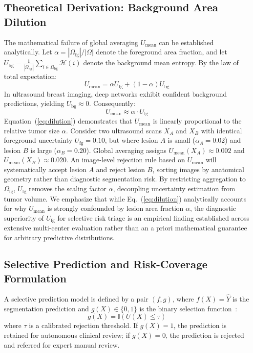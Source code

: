 \documentclass[10pt,journal,compsoc]{IEEEtran}
\begin{document}
\subsection{Theoretical Derivation: Background Area Dilution}
The mathematical failure of global averaging $U_{\mathrm{mean}}$ can be established analytically. Let $\alpha = |\Omega_{\mathrm{fg}}| / |\Omega|$ denote the foreground area fraction, and let $U_{\mathrm{bg}} = \frac{1}{|\Omega_{\mathrm{bg}}|} \sum_{i \in \Omega_{\mathrm{bg}}} \mathcal{H}(i)$ denote the background mean entropy. By the law of total expectation:
\begin{equation}
U_{\mathrm{mean}} = \alpha U_{\mathrm{fg}} + (1 - \alpha) U_{\mathrm{bg}}
\end{equation}
In ultrasound breast imaging, deep networks exhibit confident background predictions, yielding $U_{\mathrm{bg}} \approx 0$. Consequently:
\begin{equation}
U_{\mathrm{mean}} \approx \alpha \cdot U_{\mathrm{fg}}
\label{eq:dilution}
\end{equation}
Equation~(\ref{eq:dilution}) demonstrates that $U_{\mathrm{mean}}$ is linearly proportional to the relative tumor size $\alpha$. Consider two ultrasound scans $X_A$ and $X_B$ with identical foreground uncertainty $U_{\mathrm{fg}} = 0.10$, but where lesion $A$ is small ($\alpha_A = 0.02$) and lesion $B$ is large ($\alpha_B = 0.20$). Global averaging assigns $U_{\mathrm{mean}}(X_A) \approx 0.002$ and $U_{\mathrm{mean}}(X_B) \approx 0.020$. An image-level rejection rule based on $U_{\mathrm{mean}}$ will systematically accept lesion $A$ and reject lesion $B$, sorting images by anatomical geometry rather than diagnostic segmentation risk. By restricting aggregation to $\Omega_{\mathrm{fg}}$, $U_{\mathrm{fg}}$ removes the scaling factor $\alpha$, decoupling uncertainty estimation from tumor volume. We emphasize that while Eq.~(\ref{eq:dilution}) analytically accounts for why $U_{\mathrm{mean}}$ is strongly confounded by lesion area fraction $\alpha$, the diagnostic superiority of $U_{\mathrm{fg}}$ for selective risk triage is an empirical finding established across extensive multi-center evaluation rather than an a priori mathematical guarantee for arbitrary predictive distributions.

\subsection{Selective Prediction and Risk-Coverage Formulation}
A selective prediction model is defined by a pair $(f, g)$, where $f(X) = \hat{Y}$ is the segmentation prediction and $g(X) \in \{0, 1\}$ is the binary selection function~\cite{geifman2017selective}:
\begin{equation}
g(X) = \mathbb{I}\left(U(X) \le \tau\right)
\end{equation}
where $\tau$ is a calibrated rejection threshold. If $g(X) = 1$, the prediction is retained for autonomous clinical review; if $g(X) = 0$, the prediction is rejected and referred for expert manual review.
\end{document}
